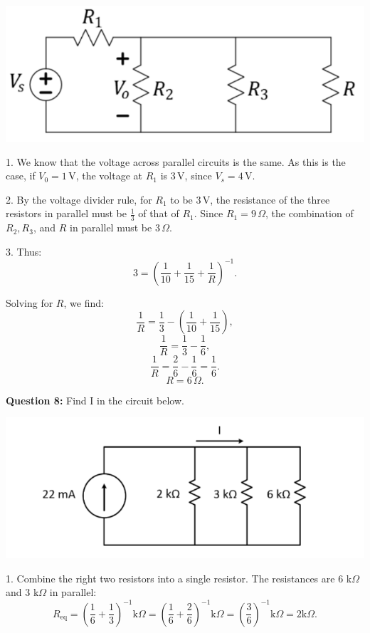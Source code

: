 \documentclass{article}
\begin{document}
\begin{center}

    \includegraphics[width=0.75\linewidth]{figures/5.png}

\end{center}

1. We know that the voltage across parallel circuits is the same. As this is the case, if \( V_0 = 1 \, \text{V} \), the voltage at \( R_1 \) is \( 3 \, \text{V} \), since \( V_s = 4 \, \text{V} \).

2. By the voltage divider rule, for \( R_1 \) to be \( 3 \, \text{V} \), the resistance of the three resistors in parallel must be \(\frac{1}{3}\) of that of \( R_1 \). Since \( R_1 = 9 \, \Omega \), the combination of \( R_2, R_3 \), and \( R \) in parallel must be \( 3 \, \Omega \).

3. Thus:
\[
3 = \left( \frac{1}{10} + \frac{1}{15} + \frac{1}{R} \right)^{-1}.
\]

Solving for \( R \), we find:
\[
\frac{1}{R} = \frac{1}{3} - \left( \frac{1}{10} + \frac{1}{15} \right),
\]
\[
\frac{1}{R} = \frac{1}{3} - \frac{1}{6},
\]
\[
\frac{1}{R} = \frac{2}{6} - \frac{1}{6} = \frac{1}{6}.
\]
\[
R = 6 \, \Omega.
\]

\textbf{Question 8:} Find I in the circuit below.

\begin{center}
\includegraphics[width=0.75\linewidth]{figures/6.png}
\end{center}


1. Combine the right two resistors into a single resistor. The resistances are 6 k$\Omega$ and 3 k$\Omega$ in parallel:
\[
R_{\text{eq}} = \left( \frac{1}{6} + \frac{1}{3} \right)^{-1} \text{k}\Omega = \left( \frac{1}{6} + \frac{2}{6} \right)^{-1} \text{k}\Omega = \left( \frac{3}{6} \right)^{-1} \text{k}\Omega = 2 \text{k}\Omega.
\]
\end{document}
